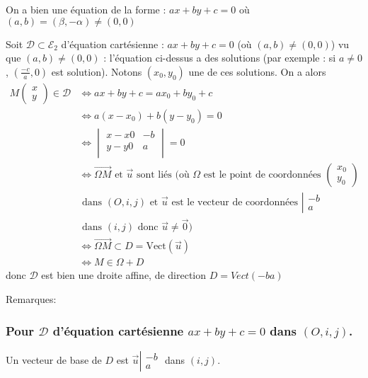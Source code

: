\documentclass[12pt,a4paper,french]{book}
\begin{document}
			On a bien une équation de la forme : $ax + by + c = 0$ où $(a,b) = (\beta,-\alpha) \neq (0,0)$
			
			 Soit $\mathcal{D} \subset \mathcal{E}_2$ d'équation cartésienne : $ax + by+c = 0$ (où $(a,b) \neq (0,0)$) vu que $(a,b) \neq (0,0)$ : l'équation ci-dessus a des solutions (par exemple : si $a \neq 0$, $(\frac{-c}{a}, 0)$ est solution). Notons $(x_0,y_0)$ une de ces solutions. On a alors \begin{equation} \begin{split}
					M\begin{pmatrix} x\\ y \end{pmatrix} \in \mathcal{D} & \Leftrightarrow ax +by+c = ax_0 + by_0 + c \\ & \Leftrightarrow a(x-x_0) + b(y-y_0) = 0 \\ & \Leftrightarrow \begin{vmatrix}
						x-x0 & -b\\ y-y0 & a\\
					\end{vmatrix} = 0 \\ & \Leftrightarrow \overrightarrow{\Omega M} \mbox{ et } \overrightarrow{u}\mbox{ sont liés (où }\Omega \mbox{ est le point de coordonnées }\begin{pmatrix} x_0\\y_0 \end{pmatrix} \\ & \mbox{ dans }(O,i,j)\mbox{ et }\overrightarrow{u} \mbox{ est le vecteur de coordonnées }\left| \begin{array}{ll} -b\\a \end{array}\right. \\ & \mbox{ dans }(i,j)\mbox{ donc }\overrightarrow{u} \neq \overrightarrow{0}) \\ & \Leftrightarrow \overrightarrow{\Omega M} \subset D = \mbox{Vect}(\overrightarrow{u}) \\ & \Leftrightarrow M \in \Omega + D
				\end{split}
			\end{equation} donc $\mathcal{D}$ est bien une droite affine, de direction $D=Vect(-b a)$
			
			Remarques:
			\subsubsection{Pour $\mathcal{D}$ d'équation cartésienne $ax+by+c=0$ dans $(O,i,j)$.}
				 Un vecteur de base de $D$ est $\overrightarrow{u} \left| \begin{array}{ll} -b\\a \end{array}\right.$ dans $(i,j)$.
\end{document}
